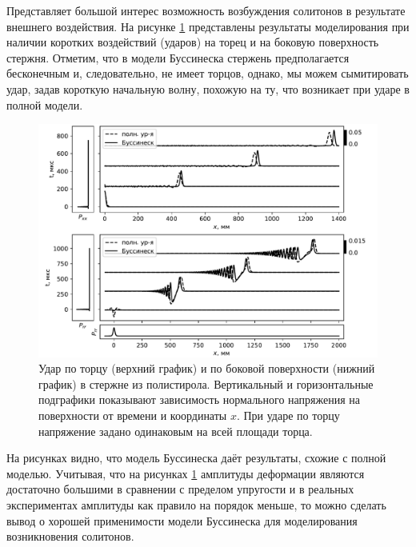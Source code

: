 \documentclass[12pt, a4paper]{article}
\begin{document}
Представляет большой интерес возможность возбуждения солитонов в результате внешнего воздействия. На рисунке \ref{fig:impact} представлены результаты моделирования при наличии коротких воздействий (ударов) на торец и на боковую поверхность стержня. Отметим, что в модели Буссинеска стержень предполагается бесконечным и, следовательно, не имеет торцов, однако, мы можем сымитировать удар, задав короткую начальную волну, похожую на ту, что возникает при ударе в полной модели.
\begin{figure}[h!]
	\centering
	\includegraphics[width=0.85\linewidth]{figures/Impact2Small}
	\caption{Удар по торцу (верхний график) и по боковой поверхности (нижний график) в стержне из полистирола. Вертикальный и горизонтальные подграфики показывают зависимость нормального напряжения на поверхности от времени и координаты $x$. При ударе по торцу напряжение задано одинаковым на всей площади торца.}
	\label{fig:impact}
	\vspace{-1mm}
\end{figure}

На рисунках видно, что модель Буссинеска даёт результаты, схожие с полной моделью. Учитывая, что на рисунках \ref{fig:impact} амплитуды деформации являются достаточно большими в сравнении с пределом упругости и в реальных экспериментах амплитуды как правило на порядок меньше, то можно сделать вывод о хорошей применимости модели Буссинеска для моделирования возникновения солитонов.




\end{document}
